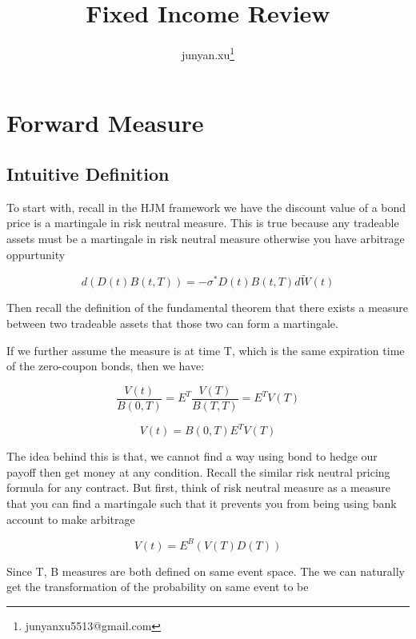 \documentclass[11pt, oneside]{article}   	%
\title{Fixed Income Review}
\author{junyan.xu\footnote{junyanxu5513@gmail.com}}
\begin{document}
\maketitle
\tableofcontents
\newpage

\section{Forward Measure}

\subsection{Intuitive Definition}

To start with, recall in the HJM framework we have the discount value of a bond price is a martingale in risk neutral measure. This is true
because any tradeable assets must be a martingale in risk neutral measure otherwise you have arbitrage oppurtunity

\begin{equation}
  d(D(t)B(t, T)) = -\sigma^{\ast}D(t)B(t, T)d\widetilde{W}(t)
\end{equation}

Then recall the definition of the fundamental theorem that there exists a measure between two tradeable assets that those two can form a martingale.

If we further assume the measure is at time T, which is the same expiration time of the zero-coupon bonds, then we have:

\begin{equation}
  \frac{V(t)}{B(0, T)} = E^{T}\frac{V(T)}{B(T, T)} = E^{T}V(T)
\end{equation}

\begin{equation}
  V(t) = B(0, T)E^{T}V(T)
\end{equation}

The idea behind this is that, we cannot find a way using bond to hedge our payoff then get money at any condition. Recall the similar risk neutral
pricing formula for any contract. But first, think of risk neutral measure as a measure that you can find a martingale such that it prevents you from being using
bank account to make arbitrage

\begin{equation}
  V(t) = E^{B}(V(T)D(T))
\end{equation}


Since T, B measures are both defined on same event space. The we can naturally get the transformation of the probability on same event to be
\end{document}
